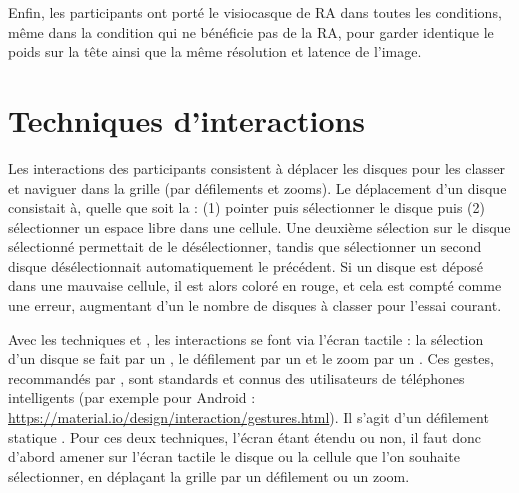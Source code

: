 Enfin, les participants ont porté le visiocasque de RA  dans toutes les conditions, même dans la condition  qui ne bénéficie pas de la RA, pour garder identique le poids sur la tête ainsi que la même résolution et latence de l'image.


\section{Techniques d'interactions}
\label{sec:experiment_interactions}

Les interactions des participants consistent à déplacer les disques pour les classer et naviguer dans la grille (par défilements et zooms). Le déplacement d'un disque consistait à, quelle que soit la  : (1) pointer puis sélectionner le disque puis (2) sélectionner un espace libre dans une cellule. Une deuxième sélection sur le disque sélectionné permettait de le désélectionner, tandis que sélectionner un second disque désélectionnait automatiquement le précédent. Si un disque est déposé dans une mauvaise cellule, il est alors coloré en rouge, et cela est compté comme une erreur, augmentant d'un le nombre de disques à classer pour l'essai courant.

Avec les techniques  et , les interactions se font via l'écran tactile : la sélection d'un disque se fait par un  , le défilement par un   et le zoom par un  . Ces gestes, recommandés par \cite{Wobbrock2009}, sont standards et connus des utilisateurs de téléphones intelligents (par exemple pour Android : \url{https://material.io/design/interaction/gestures.html}). Il s'agit d'un défilement statique \citep{Mehra2006}. Pour ces deux techniques, l'écran étant étendu ou non, il faut donc d'abord amener sur l'écran tactile le disque ou la cellule que l'on souhaite sélectionner, en déplaçant la grille par un défilement ou un zoom.


